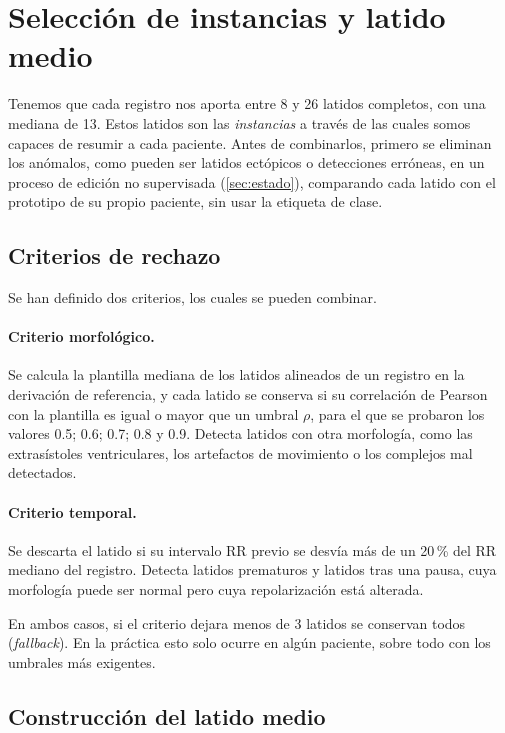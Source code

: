 \clearpage
\section{Selección de instancias y latido medio}\label{cap:instancias}

Tenemos que cada registro nos aporta entre 8 y 26 latidos completos, con una mediana de 13. Estos latidos son las \emph{instancias} a través de las cuales somos capaces de resumir a cada paciente. Antes de combinarlos, primero se eliminan los anómalos, como pueden ser latidos ectópicos o detecciones erróneas, en un proceso de edición no supervisada (\cref{sec:estado}), comparando cada latido con el prototipo de su propio paciente, sin usar la etiqueta de clase.

\subsection{Criterios de rechazo}

Se han definido dos criterios, los cuales se pueden combinar.

\paragraph{Criterio morfológico.} Se calcula la plantilla mediana de los latidos alineados de un registro en la derivación de referencia, y cada latido se conserva si su correlación de Pearson con la plantilla es igual o mayor que un umbral $\rho$, para el que se probaron los valores \num{0.5}; \num{0.6}; \num{0.7}; \num{0.8} y \num{0.9}. Detecta latidos con otra morfología, como las extrasístoles ventriculares, los artefactos de movimiento o los complejos mal detectados.

\paragraph{Criterio temporal.} Se descarta el latido si su intervalo RR previo se desvía más de un 20\,\% del RR mediano del registro. Detecta latidos prematuros y latidos tras una pausa, cuya morfología puede ser normal pero cuya repolarización está alterada.

En ambos casos, si el criterio dejara menos de 3 latidos se conservan todos (\emph{fallback}). En la práctica esto solo ocurre en algún paciente, sobre todo con los umbrales más exigentes.

\subsection{Construcción del latido medio}

